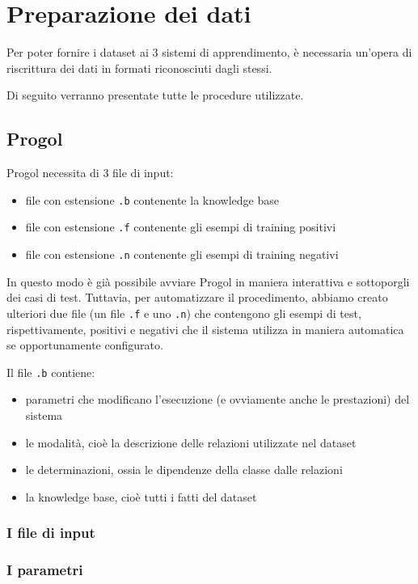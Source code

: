 \section{Preparazione dei dati}
Per poter fornire i dataset ai 3 sistemi di apprendimento, è necessaria un'opera di riscrittura dei dati in formati riconosciuti dagli stessi.

Di seguito verranno presentate tutte le procedure utilizzate.


\subsection{Progol}
\label{preparazione:progol}
Progol necessita di 3 file di input:
\begin{itemize}
\item file con estensione \verb+.b+ contenente la knowledge base
\item file con estensione \verb+.f+ contenente gli esempi di training positivi
\item file con estensione \verb+.n+ contenente gli esempi di training negativi
\end{itemize}

In questo modo è già possibile avviare Progol in maniera interattiva e sottoporgli dei casi di test. Tuttavia, per automatizzare il procedimento, abbiamo creato ulteriori due file (un file \verb+.f+ e uno \verb+.n+) che contengono gli esempi di test, rispettivamente, positivi e negativi che il sistema utilizza in maniera automatica se opportunamente configurato.

Il file \verb+.b+ contiene:
\begin{itemize}
\item parametri che modificano l'esecuzione (e ovviamente anche le prestazioni) del sistema
\item le modalità, cioè la descrizione delle relazioni utilizzate nel dataset
\item le determinazioni, ossia le dipendenze della classe dalle relazioni
\item la knowledge base, cioè tutti i fatti del dataset
\end{itemize}

\subsubsection{I file di input}

\subsubsection*{I parametri}

